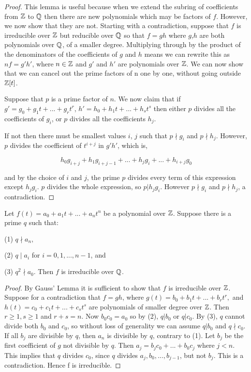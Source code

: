 \begin{proof}
This lemma is useful because when we extend the subring of coefficients from $\mathbb Z$ to $\mathbb Q$ then there are new polynomials which may be factors of $f$. However, we now show that they are not. Starting with a contradiction, suppose that $f$ is irreducible over $\mathbb Z$ but reducible over $\mathbb Q$ so that $f = g h$ where $g$,$h$ are both polynomials over $\mathbb Q$, of a smaller degree. Multiplying through by the product of the denominators of the coefficients of $g$ and $h$ means we can rewrite this as $n f = g' h'$, where $n \in \mathbb Z$ and $g'$ and $h'$ are polynomials over $\mathbb Z$. We can now show that we can cancel out the prime factors of n one by one, without going outside $\mathbb Z[t]$.

Suppose that $p$ is a prime factor of $n$. We now claim that if $g' = g_0 + g_1 t +...+ g_r t^r$, $h' = h_0 + h_1 t +...+ h_s t^s$ then either $p$ divides all the coefficients of $g_i$, or $p$ divides all the coefficients $h_j$.

If not then there must be smallest values $i$, $j$ such that $p \nmid g_i$ and $p \nmid h_j$. However, $p$ divides the coefficient of $t^{i+j}$ in $g' h'$, which is, 

$$
h_0 g_{i+j} + h_1 g_{i+j-1} +...+ h_j g_i +...+ h_{i+j} g_0
$$

and by the choice of $i$ and $j$, the prime $p$ divides every term of this expression except $h_j g_i$. $p$ divides the whole expression, so $p | h_j g_i$. However $p \nmid g_i$ and $p \nmid h_j$, a contradiction.
\end{proof}

\begin{theorem} \label{thm:eisenstein}
     Let
    $f(t) = a_0 + a_1 t + ... + a_n t^n$
    be a polynomial over $\mathbb Z$. Suppose there is a prime $q$ such that: 
    
    (1) $q \nmid a_n$, 
    
    (2) $q \mid a_i$ for $i = {0, 1,..., n-1}$, and 
    
    (3) $q^2 \nmid a_0$. Then $f$ is irreducible over $\mathbb Q$. 
\end{theorem}

\begin{proof}
By Gauss' Lemma it is sufficient to show that $f$ is irreducible over $\mathbb Z$. Suppose for a contradiction that $f = gh$, where
$
g(t)=b_0+b_1 t+ ... +b_r t^r,
$
and
$
h(t)=c_0+c_1 t+ ... +c_s t^s
$
are polynomials of smaller degree over $\mathbb Z$. Then $r \ge 1, s \ge 1$ and $r+s = n$. Now $b_0 c_0 = a_0$ so by (2), $q | b_0$ or $q|c_0$. By (3), $q$ cannot divide both $b_0$ and $c_0$, so without
loss of generality we can assume $q | b_0$ and $q \nmid c_0$. If all $b_j$ are divisible by $q$, then $a_n$ is divisible by $q$, contrary to (1). Let $b_j$ be the first coefficient of $g$ not divisible by $q$. Then
$
a_j = b_j c_0 + ...+ b_0 c_j
$
where $j < n$. This implies that $q$ divides $c_0$, since $q$ divides $a_j, b_0,..., b_{j-1}$, but not $b_j$. This is a contradiction. Hence f is irreducible.
\end{proof}

